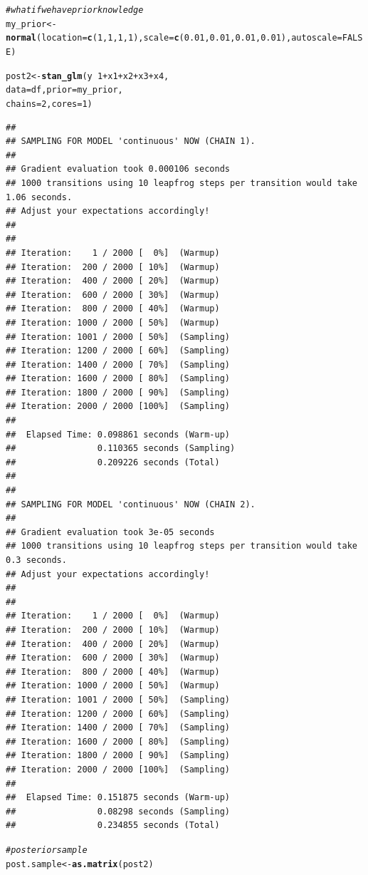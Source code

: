 \documentclass[11pt,a4paper,twoside]{book}\usepackage[]{graphicx}\usepackage[]{color}
\makeatletter
\newcommand{\hlnum}[1]{\textcolor[rgb]{0.686,0.059,0.569}{#1}}%
\newcommand{\hlcom}[1]{\textcolor[rgb]{0.678,0.584,0.686}{\textit{#1}}}%
\newcommand{\hlopt}[1]{\textcolor[rgb]{0,0,0}{#1}}%
\newcommand{\hlstd}[1]{\textcolor[rgb]{0.345,0.345,0.345}{#1}}%
\newcommand{\hlkwb}[1]{\textcolor[rgb]{0.69,0.353,0.396}{#1}}%
\newcommand{\hlkwc}[1]{\textcolor[rgb]{0.333,0.667,0.333}{#1}}%
\newcommand{\hlkwd}[1]{\textcolor[rgb]{0.737,0.353,0.396}{\textbf{#1}}}%
\newenvironment{kframe}{%
 \def\at@end@of@kframe{}%
 \ifinner\ifhmode%
  \def\at@end@of@kframe{\end{minipage}}%
  \begin{minipage}{\columnwidth}%
 \fi\fi%
 \def\FrameCommand##1{\hskip\@totalleftmargin \hskip-\fboxsep
 \colorbox{shadecolor}{##1}\hskip-\fboxsep
     \hskip-\linewidth \hskip-\@totalleftmargin \hskip\columnwidth}%
 \MakeFramed {\advance\hsize-\width
   \@totalleftmargin\z@ \linewidth\hsize
   \@setminipage}}%
 {\par\unskip\endMakeFramed%
 \at@end@of@kframe}
\newenvironment{knitrout}{}{} %
\makeatother
\begin{document}
\begin{knitrout}
\begin{kframe}
\begin{alltt}
\hlcom{#what if we have prior knowledge}
\hlstd{my_prior} \hlkwb{<-} \hlkwd{normal}\hlstd{(}\hlkwc{location} \hlstd{=} \hlkwd{c}\hlstd{(}\hlnum{1}\hlstd{,} \hlnum{1}\hlstd{,}\hlnum{1}\hlstd{,}\hlnum{1}\hlstd{),} \hlkwc{scale} \hlstd{=} \hlkwd{c}\hlstd{(}\hlnum{0.01}\hlstd{,} \hlnum{0.01}\hlstd{,}\hlnum{0.01}\hlstd{,}\hlnum{0.01}\hlstd{),} \hlkwc{autoscale} \hlstd{=} \hlnum{FALSE}\hlstd{)}

\hlstd{post2} \hlkwb{<-} \hlkwd{stan_glm}\hlstd{(y} \hlopt{~} \hlnum{1} \hlopt{+} \hlstd{x1} \hlopt{+} \hlstd{x2} \hlopt{+} \hlstd{x3} \hlopt{+} \hlstd{x4,}
                  \hlkwc{data} \hlstd{= df,} \hlkwc{prior} \hlstd{= my_prior,}
                  \hlkwc{chains} \hlstd{=} \hlnum{2}\hlstd{,} \hlkwc{cores} \hlstd{=} \hlnum{1}\hlstd{)}
\end{alltt}
\begin{verbatim}
## 
## SAMPLING FOR MODEL 'continuous' NOW (CHAIN 1).
## 
## Gradient evaluation took 0.000106 seconds
## 1000 transitions using 10 leapfrog steps per transition would take 1.06 seconds.
## Adjust your expectations accordingly!
## 
## 
## Iteration:    1 / 2000 [  0%]  (Warmup)
## Iteration:  200 / 2000 [ 10%]  (Warmup)
## Iteration:  400 / 2000 [ 20%]  (Warmup)
## Iteration:  600 / 2000 [ 30%]  (Warmup)
## Iteration:  800 / 2000 [ 40%]  (Warmup)
## Iteration: 1000 / 2000 [ 50%]  (Warmup)
## Iteration: 1001 / 2000 [ 50%]  (Sampling)
## Iteration: 1200 / 2000 [ 60%]  (Sampling)
## Iteration: 1400 / 2000 [ 70%]  (Sampling)
## Iteration: 1600 / 2000 [ 80%]  (Sampling)
## Iteration: 1800 / 2000 [ 90%]  (Sampling)
## Iteration: 2000 / 2000 [100%]  (Sampling)
## 
##  Elapsed Time: 0.098861 seconds (Warm-up)
##                0.110365 seconds (Sampling)
##                0.209226 seconds (Total)
## 
## 
## SAMPLING FOR MODEL 'continuous' NOW (CHAIN 2).
## 
## Gradient evaluation took 3e-05 seconds
## 1000 transitions using 10 leapfrog steps per transition would take 0.3 seconds.
## Adjust your expectations accordingly!
## 
## 
## Iteration:    1 / 2000 [  0%]  (Warmup)
## Iteration:  200 / 2000 [ 10%]  (Warmup)
## Iteration:  400 / 2000 [ 20%]  (Warmup)
## Iteration:  600 / 2000 [ 30%]  (Warmup)
## Iteration:  800 / 2000 [ 40%]  (Warmup)
## Iteration: 1000 / 2000 [ 50%]  (Warmup)
## Iteration: 1001 / 2000 [ 50%]  (Sampling)
## Iteration: 1200 / 2000 [ 60%]  (Sampling)
## Iteration: 1400 / 2000 [ 70%]  (Sampling)
## Iteration: 1600 / 2000 [ 80%]  (Sampling)
## Iteration: 1800 / 2000 [ 90%]  (Sampling)
## Iteration: 2000 / 2000 [100%]  (Sampling)
## 
##  Elapsed Time: 0.151875 seconds (Warm-up)
##                0.08298 seconds (Sampling)
##                0.234855 seconds (Total)
\end{verbatim}
\begin{alltt}
\hlcom{#posterior sample}
\hlstd{post.sample} \hlkwb{<-} \hlkwd{as.matrix}\hlstd{(post2)}


\end{alltt}
\end{kframe}
\end{knitrout}
\end{document}
